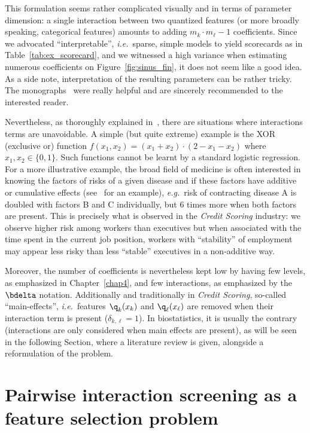 This formulation seems rather complicated visually and in terms of parameter dimension: a single interaction between two quantized features (or more broadly speaking, categorical features) amounts to adding $m_k \cdot m_\ell - 1$ coefficients. Since we advocated ``interpretable'', \textit{i.e.}\ sparse, simple models to yield scorecards as in Table~\ref{tab:ex_scorecard}, and we witnessed a high variance when estimating numerous coefficients on Figure~\ref{fig:sinus_fin}, it does not seem like a good idea. As a side note, interpretation of the resulting parameters can be rather tricky. The monographs~\cite{jaccard2003interaction,james2001interaction} were really helpful and are sincerely recommended to the interested reader.

Nevertheless, as thoroughly explained in~\cite{berry2010testing}, there are situations where interactions terms are unavoidable. A simple (but quite extreme) example is the XOR (exclusive or) function $f(x_1,x_2) = (x_1 + x_2)\cdot(2 - x_1 - x_2)$ where $x_1,x_2 \in \{0,1\}$. Such functions cannot be learnt by a standard logistic regression. For a more illustrative example, the broad field of medicine is often interested in knowing the factors of risks of a given disease and if these factors have additive or cumulative effects (see~\cite{morgan2014adversity} for an example), \textit{e.g.}\ risk of contracting disease A is doubled with factors B and C individually, but 6 times more when both factors are present. This is precisely what is observed in the \textit{Credit Scoring} industry: we observe higher risk among workers than executives but when associated with the time spent in the current job position, workers with ``stability'' of employment may appear less risky than less ``stable'' executives in a non-additive way.

Moreover, the number of coefficients is nevertheless kept low by having few levels, as emphasized in Chapter~\ref{chap4}, and few interactions, as emphasized by the $\bdelta$ notation. Additionally and traditionally in \textit{Credit Scoring}, so-called ``main-effects'', \textit{i.e.}\ features $\q_k(x_k)$ and $\q_\ell(x_\ell)$ are removed when their interaction term is present ($\delta_{k,\ell} = 1$). In biostatistics, it is usually the contrary (interactions are only considered when main effects are present), as will be seen in the following Section, where a literature review is given, alongside a reformulation of the problem.


\section{Pairwise interaction screening as a feature selection problem}

